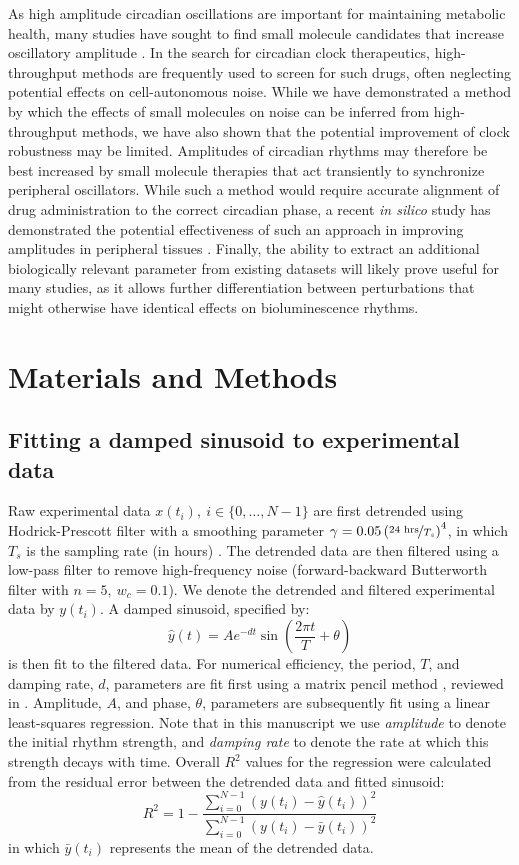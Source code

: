 \documentclass[11pt, letterpaper]{article}
\begin{document}
As high amplitude circadian oscillations are important for maintaining metabolic health, many studies have sought to find small molecule candidates that increase oscillatory amplitude \cite{Chen2013}.
In the search for circadian clock therapeutics, high-throughput methods are frequently used to screen for such drugs, often neglecting potential effects on cell-autonomous noise.
While we have demonstrated a method by which the effects of small molecules on noise can be inferred from high-throughput methods, we have also shown that the potential improvement of clock robustness may be limited.
Amplitudes of circadian rhythms may therefore be best increased by small molecule therapies that act transiently to synchronize peripheral oscillators.
While such a method would require accurate alignment of drug administration to the correct circadian phase, a recent {\itshape in silico} study has demonstrated the potential effectiveness of such an approach in improving amplitudes in peripheral tissues \cite{St.John2014a}.
Finally, the ability to extract an additional biologically relevant parameter from existing datasets will likely prove useful for many studies, as it allows further differentiation between perturbations that might otherwise have identical effects on bioluminescence rhythms.

\section*{Materials and Methods}

\subsection*{Fitting a damped sinusoid to experimental data}
Raw experimental data $x(t_i), \  i \in \{0, \dots, N-1\}$ are first detrended using Hodrick-Prescott filter with a smoothing parameter $\gamma = 0.05\left(\nicefrac{24 \text{ hrs}}{T_s}\right)^4$, in which $T_s$ is the sampling rate (in hours) \cite{Ravn2002}.
The detrended data are then filtered using a low-pass filter to remove high-frequency noise (forward-backward Butterworth filter with $n = 5,\ w_c = 0.1$).
We denote the detrended and filtered experimental data by $y(t_i)$.
A damped sinusoid, specified by:
\[
  \hat{y}(t) = A e^{-d t} \sin\left(\frac{2\pi t}{T} + \theta\right)
\]
is then fit to the filtered data.
For numerical efficiency, the period, $T$, and damping rate, $d$, parameters are fit first using a matrix pencil method \cite{Hua1990}, reviewed in \cite{Zielinski2011}.
Amplitude, $A$, and phase, $\theta$, parameters are subsequently fit using a linear least-squares regression.
Note that in this manuscript we use {\itshape amplitude} to denote the initial rhythm strength, and {\itshape damping rate} to denote the rate at which this strength decays with time.
Overall $R^2$ values for the regression were calculated from the residual error between the detrended data and fitted sinusoid:
\[
  R^2 = 1 - \frac{\sum_{i = 0}^{N-1} (y(t_i) - \hat{y}(t_i))^2}{\sum_{i = 0}^{N-1} (y(t_i) - \bar{y}(t_i))^2}
\]
in which $\bar{y}(t_i)$ represents the mean of the detrended data.
\end{document}
